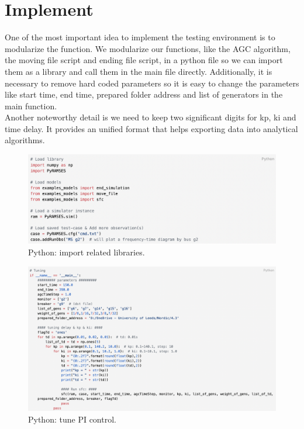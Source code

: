 \documentclass{report}
\begin{document}
\section{Implement} %
One of the most important idea to implement the testing environment is to modularize the function. We modularize our functions, like the AGC algorithm, the moving file script and ending file script, in a python file so we can import them as a library and call them in the main file directly. Additionally, it is necessary to remove hard coded parameters so it is easy to change the parameters like start time, end time, prepared folder address and list of generators in the main function.\\

Another noteworthy detail is we need to keep two significant digits for kp, ki and time delay. It provides an unified format that helps exporting data into analytical algorithms.\\

\begin{figure}[htbp]
\centering
\includegraphics[width = \textwidth]{figure/4_3_code1.png}
\caption{Python: import related libraries.}
\label{4_3_code1}
\end{figure}

\begin{figure}[htbp]
\centering
\includegraphics[width = \textwidth]{figure/4_3_code2.png}
\caption{Python: tune PI control.}
\label{4_3_code2}
\end{figure}
\end{document}
